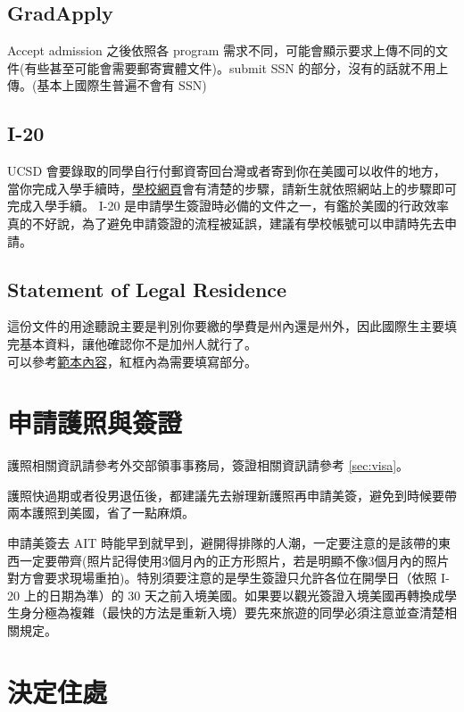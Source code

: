 \documentclass[10pt,a4paper]{book}
\begin{document}
\begin{CJK}{UTF8}{bkai}
\subsection{GradApply}
Accept admission 之後依照各 program 需求不同，可能會顯示要求上傳不同的文件(有些甚至可能會需要郵寄實體文件)。submit SSN 的部分，沒有的話就不用上傳。(基本上國際生普遍不會有 SSN)

\subsection{I-20}
UCSD 會要錄取的同學自行付郵資寄回台灣或者寄到你在美國可以收件的地方，當你完成入學手續時，\href{https://icenter.ucsd.edu/ispo/new/index.html}{學校網頁}會有清楚的步驟，請新生就依照網站上的步驟即可完成入學手續。
I-20 是申請學生簽證時必備的文件之一，有鑑於美國的行政效率真的不好說，為了避免申請簽證的流程被延誤，建議有學校帳號可以申請時先去申請。

\subsection{Statement of Legal Residence}
這份文件的用途聽說主要是判別你要繳的學費是州內還是州外，因此國際生主要填完基本資料，讓他確認你不是加州人就行了。\\
可以參考\href{https://drive.google.com/file/d/1IEqT0NRcfPAuc9X-UyOSKAY0vkTENlCH/view?usp=sharing}{範本內容}，紅框內為需要填寫部分。

\section{申請護照與簽證}

護照相關資訊請參考外交部領事事務局，簽證相關資訊請參考 \ref{sec:visa}。

護照快過期或者役男退伍後，都建議先去辦理新護照再申請美簽，避免到時候要帶兩本護照到美國，省了一點麻煩。

申請美簽去 AIT 時能早到就早到，避開得排隊的人潮，一定要注意的是該帶的東西一定要帶齊(照片記得使用3個月內的正方形照片，若是明顯不像3個月內的照片對方會要求現場重拍)。特別須要注意的是學生簽證只允許各位在開學日（依照 I-20 上的日期為準）的 30 天之前入境美國。如果要以觀光簽證入境美國再轉換成學生身分極為複雜（最快的方法是重新入境）要先來旅遊的同學必須注意並查清楚相關規定。

\section{決定住處}


\end{CJK}
\end{document}
